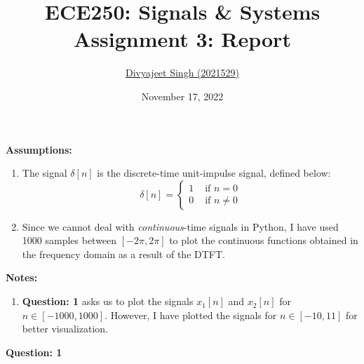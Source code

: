 \documentclass{article}
\title{
    \textbf{ECE250: Signals \& Systems} \\
    \large{Assignment 3: Report}
}
\author{\href{mailto:divyajeet21529@iiitd.ac.in}{Divyajeet Singh (2021529)}}
\date{November 17, 2022}
\begin{document}
    \maketitle

    \textbf{Assumptions:}

    \begin{enumerate}
        \item The signal $\delta[n]$ is the discrete-time unit-impulse signal, defined below: \begin{equation}
            \delta[n] = \begin{cases}
                1 & \text{ if } n = 0 \\
                0 & \text{ if } n \neq 0
            \end{cases}
        \end{equation}

        \item Since we cannot deal with \textit{continuous}-time signals in Python, I
        have used 1000 samples between $[-2\pi, 2\pi]$ to plot the continuous functions obtained
        in the frequency domain as a result of the DTFT.
    \end{enumerate}
    \vspace{5mm}

    \textbf{Notes:}

    \begin{enumerate}
        \item
        \textbf{Question: 1} asks us to plot the signals $x_1[n]$ and $x_2[n]$ for $n \in [-1000, 1000]$. However,
        I have plotted the signals for $n \in [-10, 11]$ for better visualization.
    \end{enumerate}
    \vspace{1cm}

    \textbf{Question: 1}
\end{document}
